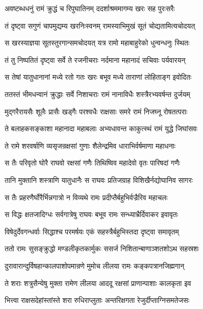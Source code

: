 \twolineshloka
{अवष्टब्धधनुं रामं क्रुद्धं च रिपुघातिनम्}
{ददर्शाश्रममागम्य खरः सह पुरःसरैः} %

\twolineshloka
{तं दृष्ट्वा सगुणं चापमुद्यम्य खरनिःस्वनम्}
{रामस्याभिमुखं सूतं चोद्यतामित्यचोदयत्} %

\twolineshloka
{स खरस्याज्ञया सूतस्तुरगान्समचोदयत्}
{यत्र रामो महाबाहुरेको धुन्वन्धनुः स्थितः} %

\twolineshloka
{तं तु निष्पतितं दृष्ट्वा सर्वे ते रजनीचराः}
{नर्दमाना महानादं सचिवाः पर्यवारयन्} %

\twolineshloka
{स तेषां यातुधानानां मध्ये रतो गतः खरः}
{बभूव मध्ये ताराणां लोहिताङ्ग इवोदितः} %

\twolineshloka
{ततस्तं भीमधन्वानं क्रुद्धाः सर्वे निशाचराः}
{रामं नानाविधैः शस्त्रैरभ्यवर्षन्त दुर्जयम्} %

\twolineshloka
{मुद्गरैरायसैः शूलैः प्रासैः खड्गैः परश्वधैः}
{राक्षसाः समरे रामं निजघ्नू रोषतत्पराः} %

\twolineshloka
{ते बलाहकसङ्काशा महानादा महाबलाः}
{अभ्यधावन्त काकुत्स्थं रामं युद्धे जिघांसवः} %

\twolineshloka
{ते रामे शरवर्षाणि व्यसृजन्रक्षसां गुणाः}
{शैलेन्द्रमिव धाराभिर्वर्षमाणा महाधनाः} %

\twolineshloka
{स तैः परिवृतो घोरै राघवो रक्षसां गणैः}
{तिथिष्विव महादेवो वृतः पारिषदां गणैः} %

\twolineshloka
{तानि मुक्तानि शस्त्राणि यातुधानैः स राघवः}
{प्रतिजग्राह विशिखैर्नद्योघानिव सागरः} %

\twolineshloka
{स तैः प्रहरणैर्घोरैर्भिन्नगात्रो न विव्यथे}
{रामः प्रदीप्तैर्बहुभिर्वज्रैरिव महाचलः} %

\twolineshloka
{स विद्धः क्षतजादिग्धः सर्वगात्रेषु राघवः}
{बभूव रामः सन्ध्याभ्रैर्दिवाकर इवावृतः} %

\twolineshloka
{विषेदुर्देवगन्धर्वाः सिद्धाश्च परमर्षयः}
{एकं सहस्त्रैर्बहुभिस्तदा दृष्ट्वा समावृतम्} %

\twolineshloka
{ततो रामः सुसङ्क्रुद्धो मण्डलीकृतकार्मुकः}
{ससर्ज निशितान्बाणाञ्शतशोऽथ सहस्रशः} %

\twolineshloka
{दुरावारान्दुर्विषहान्कालपाशोपमान्रणे}
{मुमोच लीलया रामः कङ्कपत्रानजिह्मगान्} %

\twolineshloka
{ते शराः शत्रुसैन्येषु मुक्ता रामेण लीलया}
{आददू रक्षसां प्राणान्पाशाः कालकृता इव} %

\twolineshloka
{भित्त्वा राक्षसदेहांस्तांस्ते शरा रुधिराप्लुताः}
{अन्तरिक्षगता रेजुर्दीप्ताग्निसमतेजसः} %

